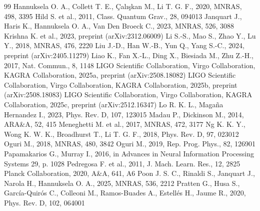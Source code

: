 \begin{thebibliography}{99}
Hannuksela O. A., Collett T. E., {\c{C}}al{\i}{\c{s}}kan M., Li T. G. F., 2020, MNRAS, 498, 3395
Hild S. et al., 2011, Class. Quantum Grav., 28, 094013
Janquart J., Haris K., Hannuksela O. A., Van Den Broeck C., 2023, MNRAS, 526, 3088
Krishna K. et al., 2023, preprint (arXiv:2312.06009)
Li S.-S., Mao S., Zhao Y., Lu Y., 2018, MNRAS, 476, 2220
Liu J.-D., Han W.-B., Yun Q., Yang S.-C., 2024, preprint (arXiv:2405.11279)
Liao K., Fan X.-L., Ding X., Biesiada M., Zhu Z.-H., 2017, Nat. Commun., 8, 1148
LIGO Scientific Collaboration, Virgo Collaboration, KAGRA Collaboration, 2025a, preprint (arXiv:2508.18082)
LIGO Scientific Collaboration, Virgo Collaboration, KAGRA Collaboration, 2025b, preprint (arXiv:2508.18083)
LIGO Scientific Collaboration, Virgo Collaboration, KAGRA Collaboration, 2025c, preprint (arXiv:2512.16347)
Lo R. K. L., Maga{\~n}a Hernandez I., 2023, Phys. Rev. D, 107, 123015
Madau P., Dickinson M., 2014, ARA\&A, 52, 415
Meneghetti M. et al., 2017, MNRAS, 472, 3177
Ng K. K. Y., Wong K. W. K., Broadhurst T., Li T. G. F., 2018, Phys. Rev. D, 97, 023012
Oguri M., 2018, MNRAS, 480, 3842
Oguri M., 2019, Rep. Prog. Phys., 82, 126901
Papamakarios G., Murray I., 2016, in Advances in Neural Information Processing Systems 29, p. 1028
Pedregosa F. et al., 2011, J. Mach. Learn. Res., 12, 2825
Planck Collaboration, 2020, A\&A, 641, A6
Poon J. S. C., Rinaldi S., Janquart J., Narola H., Hannuksela O. A., 2025, MNRAS, 536, 2212
Pratten G., Husa S., Garc{\'i}a-Quir{\'o}s C., Colleoni M., Ramos-Buades A., Estell{\'e}s H., Jaume R., 2020, Phys. Rev. D, 102, 064001

\end{thebibliography}
